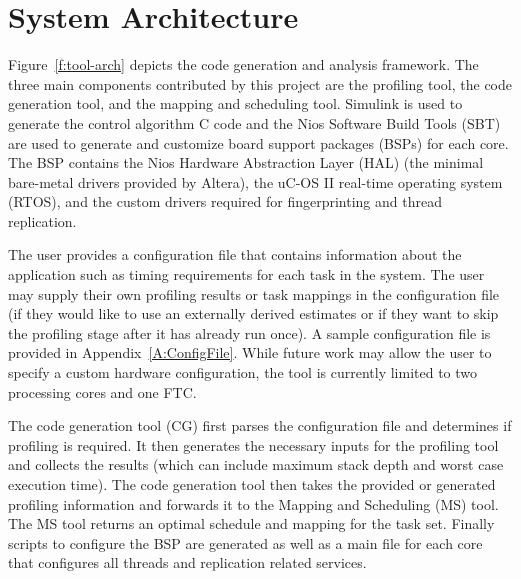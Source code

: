 
\chapter{System Architecture} %

\label{c:tool-arch} %

	Figure~\ref{f:tool-arch} depicts the code generation and analysis framework. 
	The three main components contributed by this project are the profiling tool, the code generation tool, and the mapping and scheduling tool. 
	Simulink is used to generate the control algorithm C code and the Nios Software Build Tools (SBT) are used to generate and customize board support packages (BSPs) for each core. 
	The BSP contains the Nios Hardware Abstraction Layer (HAL) (the minimal bare-metal drivers provided by Altera), the uC-OS II real-time operating system (RTOS), and the custom drivers required for fingerprinting and thread replication. 

 
	The user provides a configuration file that contains information about the application such as timing requirements for each task in the system. 
	The user may supply their own profiling results or task mappings in the configuration file (if they would like to use an externally derived estimates or if they want to skip the profiling stage after it has already run once). 
	A sample configuration file is provided in Appendix~\ref{A:ConfigFile}. 
	While future work may allow the user to specify a custom hardware configuration, the tool is currently limited to two processing cores and one FTC. 


	The code generation tool (CG) first parses the configuration file and determines if profiling is required. 
	It then generates the necessary inputs for the profiling tool and collects the results (which can include maximum stack depth and worst case execution time). 
	The code generation tool then takes the provided or generated profiling information and forwards it to the Mapping and Scheduling (MS) tool. 
	The MS tool returns an optimal schedule and mapping for the task set. 
	Finally scripts to configure the BSP are generated as well as a main file for each core that configures all threads and replication related services. 	
	